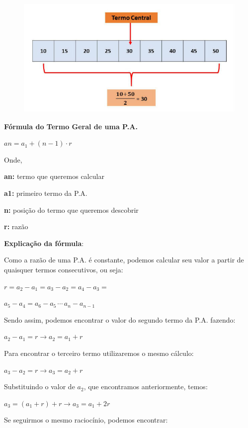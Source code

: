 \begin{multicols*}{2}
	\begin{figure}[H]
		\centering
		\includegraphics[width=\columnwidth]{assets/papropriedade3.jpg}
	\end{figure}

	\textbf{Fórmula do Termo Geral de uma P.A.}

	{$ an = a_1 + (n - 1) \cdot r $}

	Onde,

	\textbf{an:} termo que queremos calcular

	\textbf{a1:} primeiro termo da P.A.

	\textbf{n:} posição do termo que queremos descobrir

	\textbf{r:} razão

	\textbf{Explicação da fórmula}:

	Como a razão de uma P.A. é constante, podemos calcular seu valor a partir de quaisquer termos consecutivos, ou seja:

	{$ r = a_2 - a_1 = a_3 - a_2 = a_4 - a_3 =$}

	{$ a_5 - a_4 = a_6 - a_5 \, \cdots \, a_n - a_{n-1} $}

	Sendo assim, podemos encontrar o valor do segundo termo da P.A. fazendo:

	{$ a_2 - a_1 = r  \to a_2 = a_1 + r $}

	Para encontrar o terceiro termo utilizaremos o mesmo cálculo:

	{$ a_3 - a_2 = r  \to a_3 = a_2 + r $}

	Substituindo o valor de $a_2$, que encontramos anteriormente, temos:

	{$ a_3 = (a_1 + r) + r \to a_3 = a_1 + 2r $}

	Se seguirmos o mesmo raciocínio, podemos encontrar:


\end{multicols*}
